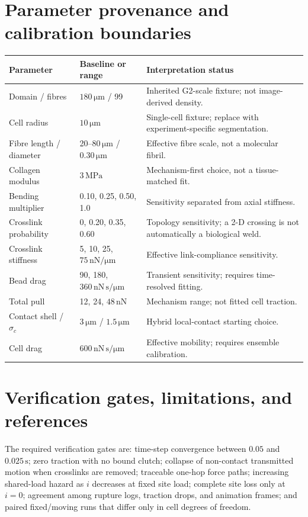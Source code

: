 \documentclass[10.5pt]{article}
\newcommand{\unit}[1]{\,\mathrm{#1}}
\begin{document}
\section{Parameter provenance and calibration boundaries}

\begin{longtable}{>{\raggedright\arraybackslash}p{}p{}p{}}
\toprule
Parameter & Baseline or range & Interpretation status \\
\midrule
Domain / fibres & $180\unit{\mu m}$ / 99 & Inherited G2-scale fixture; not image-derived density. \\
Cell radius & $10\unit{\mu m}$ & Single-cell fixture; replace with experiment-specific segmentation. \\
Fibre length / diameter & 20--$80\unit{\mu m}$ / $0.30\unit{\mu m}$ & Effective fibre scale, not a molecular fibril. \\
Collagen modulus & $3\unit{MPa}$ & Mechanism-first choice, not a tissue-matched fit. \\
Bending multiplier & 0.10, 0.25, 0.50, 1.0 & Sensitivity separated from axial stiffness. \\
Crosslink probability & 0, 0.20, 0.35, 0.60 & Topology sensitivity; a 2-D crossing is not automatically a biological weld. \\
Crosslink stiffness & 5, 10, 25, $75\unit{nN/\mu m}$ & Effective link-compliance sensitivity. \\
Bead drag & 90, 180, $360\unit{nN\,s/\mu m}$ & Transient sensitivity; requires time-resolved fitting. \\
Total pull & 12, 24, $48\unit{nN}$ & Mechanism range; not fitted cell traction. \\
Contact shell / $\sigma_c$ & $3\unit{\mu m}$ / $1.5\unit{\mu m}$ & Hybrid local-contact starting choice. \\
Cell drag & $600\unit{nN\,s/\mu m}$ & Effective mobility; requires ensemble calibration. \\
\bottomrule
\end{longtable}

\section{Verification gates, limitations, and references}

The required verification gates are: time-step convergence between $0.05$ and
$0.025\unit{s}$; zero traction with no bound clutch; collapse of non-contact transmitted motion
when crosslinks are removed; traceable one-hop force paths; increasing shared-load hazard as
$i$ decreases at fixed site load; complete site loss only at $i=0$; agreement among rupture logs,
traction drops, and animation frames; and paired fixed/moving runs that differ only in cell
degrees of freedom.
\end{document}
